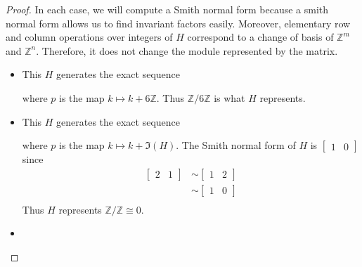 \documentclass[12pt, psamsfonts]{amsart}
\theoremstyle{definition}
\theoremstyle{remark}
\numberwithin{equation}{section}
\begin{document}
\begin{proof}
  In each case, we will compute a Smith normal form because a smith normal form allows us to find invariant factors easily.
  Moreover, elementary row and column operations over integers of $H$ correspond to a change of basis of $\mathbb{Z}^m$ and $\mathbb{Z}^n$.
  Therefore, it does not change the module represented by the matrix.
  \begin{itemize}
    \item
      This $H$ generates the exact sequence

      \begin{center}
      \end{center}

      where $p$ is the map $k \mapsto k + 6\mathbb{Z}$.
      Thus $\mathbb{Z}/6\mathbb{Z}$ is what $H$ represents.
    \item
      This $H$ generates the exact sequence

      \begin{center}
      \end{center}

      where $p$ is the map $k \mapsto k + \Im(H)$.
      The Smith normal form of $H$ is $\begin{bmatrix} 1 & 0 \end{bmatrix}$ since
      \begin{align*}
        \begin{bmatrix} 2 & 1 \end{bmatrix}
          &\sim \begin{bmatrix} 1 & 2 \end{bmatrix} \\
          &\sim \begin{bmatrix} 1 & 0 \end{bmatrix} \\
      \end{align*}
      Thus $H$ represents $\mathbb{Z}/\mathbb{Z} \cong 0$.
    \item
      \todo[inline,caption={}]{
      }
  \end{itemize}
\end{proof}
\end{document}
